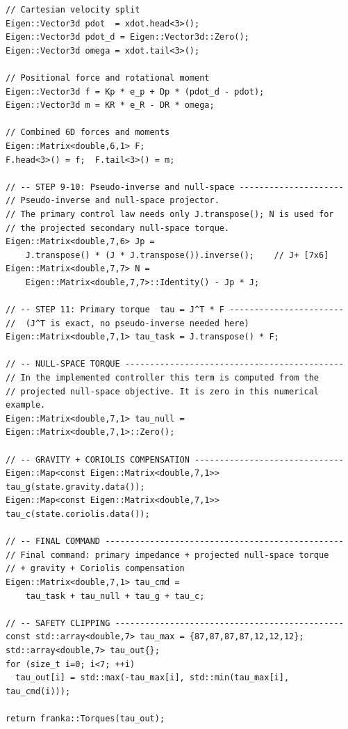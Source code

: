 \begin{lstlisting}[style=cppstyle,
  caption={One iteration of the Panda 7-DOF impedance control loop
           (\texttt{libfranka} torque callback, 1\,ms period)},
  label={lst:panda}]
// Cartesian velocity split
Eigen::Vector3d pdot  = xdot.head<3>();
Eigen::Vector3d pdot_d = Eigen::Vector3d::Zero();
Eigen::Vector3d omega = xdot.tail<3>();

// Positional force and rotational moment
Eigen::Vector3d f = Kp * e_p + Dp * (pdot_d - pdot);
Eigen::Vector3d m = KR * e_R - DR * omega;

// Combined 6D forces and moments
Eigen::Matrix<double,6,1> F;
F.head<3>() = f;  F.tail<3>() = m;

// -- STEP 9-10: Pseudo-inverse and null-space ---------------------
// Pseudo-inverse and null-space projector.
// The primary control law needs only J.transpose(); N is used for
// the projected secondary null-space torque.
Eigen::Matrix<double,7,6> Jp =
    J.transpose() * (J * J.transpose()).inverse();    // J+ [7x6]
Eigen::Matrix<double,7,7> N =
    Eigen::Matrix<double,7,7>::Identity() - Jp * J;

// -- STEP 11: Primary torque  tau = J^T * F -----------------------
//  (J^T is exact, no pseudo-inverse needed here)
Eigen::Matrix<double,7,1> tau_task = J.transpose() * F;

// -- NULL-SPACE TORQUE --------------------------------------------
// In the implemented controller this term is computed from the
// projected null-space objective. It is zero in this numerical example.
Eigen::Matrix<double,7,1> tau_null = Eigen::Matrix<double,7,1>::Zero();

// -- GRAVITY + CORIOLIS COMPENSATION ------------------------------
Eigen::Map<const Eigen::Matrix<double,7,1>> tau_g(state.gravity.data());
Eigen::Map<const Eigen::Matrix<double,7,1>> tau_c(state.coriolis.data());

// -- FINAL COMMAND ------------------------------------------------
// Final command: primary impedance + projected null-space torque
// + gravity + Coriolis compensation
Eigen::Matrix<double,7,1> tau_cmd =
    tau_task + tau_null + tau_g + tau_c;

// -- SAFETY CLIPPING ----------------------------------------------
const std::array<double,7> tau_max = {87,87,87,87,12,12,12};
std::array<double,7> tau_out{};
for (size_t i=0; i<7; ++i)
  tau_out[i] = std::max(-tau_max[i], std::min(tau_max[i], tau_cmd(i)));

return franka::Torques(tau_out);
\end{lstlisting}

